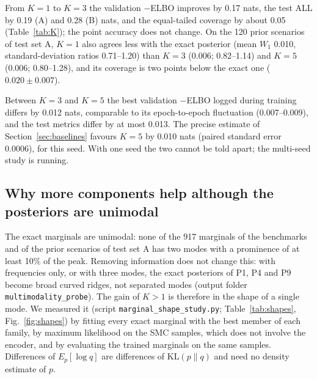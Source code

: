 \documentclass[11pt]{article}
\begin{document}
From $K=1$ to $K=3$ the validation $-$ELBO improves by 0.17 nats, the test ALL by 0.19 (A) and 0.28 (B) nats, and the
equal-tailed coverage by about 0.05 (Table~\ref{tab:K}); the point accuracy does not change. On the 120 prior scenarios of
test set A, $K=1$ also agrees less with the exact posterior (mean $W_1$ 0.010, standard-deviation ratios 0.71--1.20) than
$K=3$ (0.006; 0.82--1.14) and $K=5$ (0.006; 0.80--1.28), and its coverage is two points below the exact one
($0.020\pm0.007$).

Between $K=3$ and $K=5$ the best validation $-$ELBO logged during training differs by 0.012 nats, comparable to its
epoch-to-epoch fluctuation (0.007--0.009), and the test metrics differ by at most 0.013. The precise estimate of
Section~\ref{sec:baselines} favours $K=5$ by 0.010 nats (paired standard error 0.0006), for this seed. With one seed the
two cannot be told apart; the multi-seed study is running.

\subsection{Why more components help although the posteriors are unimodal}\label{sec:shapes}
The exact marginals are unimodal: none of the 917 marginals of the benchmarks and of the prior scenarios of test set A
has two modes with a prominence of at least 10\% of the peak. Removing information does not change this: with frequencies
only, or with three modes, the exact posteriors of P1, P4 and P9 become broad curved ridges, not separated modes
(output folder \texttt{multimodality\_probe}). The gain of $K>1$ is therefore in the shape of a single mode. We measured
it (script \texttt{marginal\_shape\_study.py}; Table~\ref{tab:shapes},
Fig.~\ref{fig:shapes}) by fitting every exact marginal with the best member of each family, by maximum likelihood on
the SMC samples, which does not involve the encoder, and by evaluating the trained marginals on the same samples.
Differences of $E_p[\log q]$ are differences of $\mathrm{KL}(p\|q)$ and need no density estimate of $p$.
\end{document}
